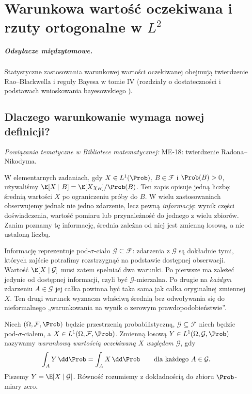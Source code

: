\chapter{Warunkowa wartość oczekiwana i rzuty ortogonalne w \texorpdfstring{$L^2$}{L2}}
\label{ch:condexp}

\providecommand{\atlasref}[2]{#2}

\paragraph{Odsyłacze międzytomowe.}
Statystyczne zastosowania warunkowej wartości oczekiwanej
obejmują twierdzenie Rao--Blackwella i reguły Bayesa w tomie IV
(rozdziały o dostateczności i podstawach wnioskowania bayesowskiego%
).

\section{Dlaczego warunkowanie wymaga nowej definicji?}

\noindent\emph{Powiązania tematyczne w Bibliotece matematycznej:} \atlasref{ME-18::thm:RN-sigfin-18}{ME-18: twierdzenie Radona--Nikodyma}.


W elementarnych zadaniach, gdy $X\in L^1(\Prob)$,
$B\in\mathcal F$ i $\Prob(B)>0$, używaliśmy
$\E[X\mid B]=\E[X\chi_{B}]/\Prob(B)$.
Ten zapis opisuje jedną liczbę: średnią wartości $X$
po ograniczeniu próby do $B$. W wielu zastosowaniach
obserwujemy jednak nie jedno zdarzenie, lecz pewną
\emph{informację}: wynik części doświadczenia, wartość
pomiaru lub przynależność do jednego z wielu zbiorów.
Zanim poznamy tę informację, średnia zależna od niej
jest zmienną losową, a nie ustaloną liczbą.

Informację reprezentuje pod-$\sigma$-ciało
$\mathcal G\subseteq\mathcal F$: zdarzenia z
$\mathcal G$ są dokładnie tymi, których zajście
potrafimy rozstrzygnąć na podstawie dostępnej obserwacji.
Wartość $\E[X\mid\mathcal G]$ musi zatem
spełniać dwa warunki. Po pierwsze ma zależeć jedynie
od dostępnej informacji, czyli być
$\mathcal G$-mierzalna. Po drugie na \emph{każdym}
zdarzeniu $A\in\mathcal G$ jej całka powinna być
taka sama jak całka oryginalnej zmiennej $X$.
Ten drugi warunek wyznacza właściwą średnią bez
odwoływania się do nieformalnego „warunkowania
na wynik o zerowym prawdopodobieństwie”.

\begin{definicja}
Niech $(\Omega,\mathcal F,\Prob)$ będzie przestrzenią
probabilistyczną, $\mathcal G\subseteq\mathcal F$
niech będzie pod-$\sigma$-ciałem, a $X\in L^1(\Omega,
\mathcal F,\Prob)$. Zmienną losową
$Y\in L^1(\Omega,\mathcal G,\Prob)$ nazywamy
\emph{warunkową wartością oczekiwaną $X$ względem
$\mathcal G$}, gdy
\[
\int_A Y\,\dd\Prob=\int_A X\,\dd\Prob
\qquad\text{dla każdego }A\in\mathcal G.
\]
Piszemy $Y=\E[X\mid\mathcal G]$.
Równość rozumiemy z dokładnością do zbioru
$\Prob$-miary zero.
\end{definicja}

